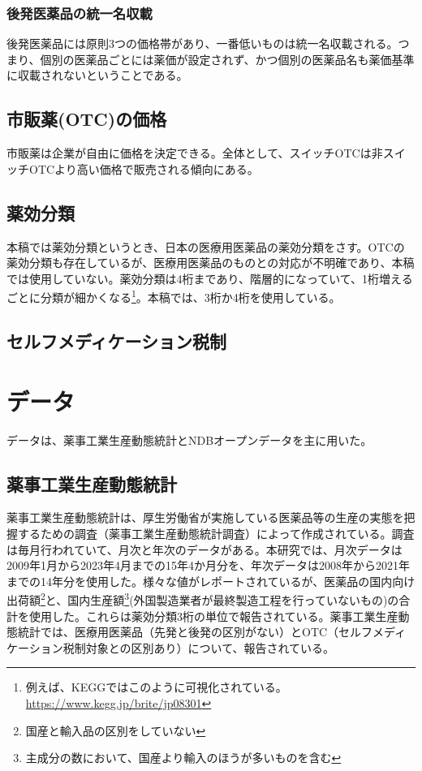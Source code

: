 \documentclass[a4paper,12pt,uplatex]{jsarticle}
\theoremstyle{definition}
\begin{document}
\subsubsection{後発医薬品の統一名収載}
後発医薬品には原則3つの価格帯があり、一番低いものは統一名収載される。つまり、個別の医薬品ごとには薬価が設定されず、かつ個別の医薬品名も薬価基準に収載されないということである。
\subsection{市販薬(OTC)の価格}
市販薬は企業が自由に価格を決定できる。全体として、スイッチOTCは非スイッチOTCより高い価格で販売される傾向にある\citep{iseikyoku2021}。
\subsection{薬効分類}
本稿では薬効分類というとき、日本の医療用医薬品の薬効分類をさす。OTCの薬効分類も存在しているが、医療用医薬品のものとの対応が不明確であり、本稿では使用していない。薬効分類は4桁まであり、階層的になっていて、1桁増えるごとに分類が細かくなる\footnote{例えば、KEGGではこのように可視化されている。\url{https://www.kegg.jp/brite/jp08301}}。本稿では、3桁か4桁を使用している。
\subsection{セルフメディケーション税制}

\section{データ} 
データは、薬事工業生産動態統計とNDBオープンデータを主に用いた。
\subsection{薬事工業生産動態統計}
薬事工業生産動態統計は、厚生労働省が実施している医薬品等の生産の実態を把握するための調査（薬事工業生産動態統計調査）によって作成されている。調査は毎月行われていて、月次と年次のデータがある。本研究では、月次データは2009年1月から2023年4月までの15年4か月分を、年次データは2008年から2021年までの14年分を使用した。様々な値がレポートされているが、医薬品の国内向け出荷額\footnote{国産と輸入品の区別をしていない}と、国内生産額\footnote{主成分の数において、国産より輸入のほうが多いものを含む}(外国製造業者が最終製造工程を行っていないもの)の合計を使用した。これらは薬効分類3桁の単位で報告されている。薬事工業生産動態統計では、医療用医薬品（先発と後発の区別がない）とOTC（セルフメディケーション税制対象との区別あり）について、報告されている。
\end{document}
